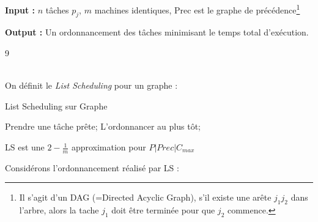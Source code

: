 \documentclass[a4paper, 11pt]{thesis}
\newcommand{\openord}[1]{\begin{center}\begin{ganttchart}[hgrid=true,vgrid={{dotted}},inline]{#1}
    \gantttitlelist{1,...,#1}{1}\\}
\newcommand{\closeord}{\end{ganttchart}\end{center}}
\begin{document}
\textbf{Input :} $n$ tâches $p_j$, $m$ machines identiques, Prec est le graphe de
        précédence\footnote{Il s'agit d'un DAG (=Directed Acyclic Graph), s'il existe une arête
        $j_1j_2$ dans l'arbre, alors la tache $j_1$ doit être terminée pour que $j_2$ commence.}
\begin{center}
\end{center}

\textbf{Output :} Un ordonnancement des tâches minimisant le temps total d'exécution.

\openord{9}
    \\
\closeord

On définit le \emph{List Scheduling} pour un graphe :

\begin{algorithm}[h!]
    \caption{List Scheduling sur Graphe}
    \label{alg_ls_g}
    \begin{algorithmic}[1]
            \State Prendre une tâche prête;
            \State L'ordonnancer au plus tôt;
        \EndWhile
    \end{algorithmic}
\end{algorithm}

\begin{thrm}
    LS est une $2 - \frac{1}{m}$ approximation pour $P|Prec|C_{max}$
\end{thrm}

Considérons l'ordonnancement réalisé par LS :
\end{document}
